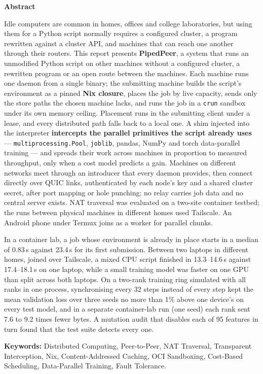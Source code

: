 \clearpage
\thispagestyle{plain}
\begin{center}
  {\Large\bfseries Abstract}
\end{center}
\vspace{0.6cm}

\noindent Idle computers are common in homes, offices and college laboratories,
but using them for a Python script normally requires a configured cluster, a
program rewritten against a cluster API, and machines that can reach one
another through their routers. This report presents \textbf{PipedPeer}, a
system that runs an unmodified Python script on other machines without a
configured cluster, a rewritten program or an open route between the machines. Each machine runs one daemon from a single binary; the submitting machine
builds the script's environment as a pinned \textbf{Nix closure}, places the job
by live capacity, sends only the store paths the chosen machine lacks, and runs
the job in a \texttt{crun} sandbox under its own memory ceiling. Placement
runs in the submitting client under a lease, and every distributed path falls
back to a local one. A shim injected
into the interpreter \textbf{intercepts the parallel primitives the script already
uses} --- \texttt{multiprocessing.Pool}, \texttt{joblib}, pandas, NumPy and torch
data-parallel training --- and spreads their work across machines in proportion
to measured throughput, only when a cost model predicts a gain. Machines on
different networks meet through an introducer that every daemon provides, then
connect directly over QUIC links, authenticated by each node's key and a shared
cluster secret, after port mapping or hole punching; no relay carries job data
and no central server exists. NAT traversal was evaluated on a two-site
container testbed; the runs between physical machines in different homes used
Tailscale. An Android phone under Termux joins as a worker
for parallel chunks.

\noindent In a container lab, a job whose environment is already in place
starts in a median of 0.83\,s against 23.4\,s for its first submission. Between
two laptops in different homes, joined over Tailscale, a mixed CPU script
finished in 13.3--14.6\,s against 17.4--18.1\,s on one laptop, while a small
training model was faster on one GPU than split across both laptops. On a two-rank training
ring simulated with all ranks in one process, synchronising every 32 steps
instead of every step kept the mean validation loss over three seeds no more
than 1\% above one device's on every test model, and in a separate
container-lab run (one seed) each rank sent 7.6 to 9.2 times fewer bytes. A
mutation audit that disables each of 95 features in turn found that the test
suite detects every one.

\vspace{0.6cm}
\noindent\textbf{Keywords:} Distributed Computing, Peer-to-Peer, NAT Traversal,
Transparent Interception, Nix, Content-Addressed Caching, OCI Sandboxing,
Cost-Based Scheduling, Data-Parallel Training, Fault Tolerance.
